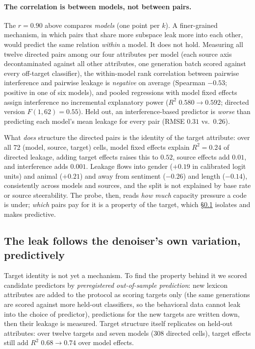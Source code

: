 \documentclass[11pt]{article}
\begin{document}
\paragraph{The correlation is between models, not between pairs.} The $r{=}0.90$
above compares \emph{models} (one point per $k$). A finer-grained mechanism, in which
pairs that share more subspace leak more into each other, would predict the same relation
\emph{within} a model. It does not hold. Measuring all twelve directed pairs among
our four attributes per model (each source axis decontaminated against all other
attributes, one generation batch scored against every off-target classifier), the
within-model rank correlation between pairwise interference and pairwise leakage is
\emph{negative} on average (Spearman $-0.53$; positive in one of six models), and
pooled regressions with model fixed effects assign interference no incremental
explanatory power ($R^2$ $0.580\!\to\!0.592$; directed version $F(1,62){=}0.55$).
Held out, an interference-based predictor is \emph{worse} than predicting each
model's mean leakage for every pair (RMSE $0.31$ vs.\ $0.26$).

What \emph{does} structure the directed pairs is the identity of the target
attribute: over all 72 (model, source, target) cells, model fixed effects explain
$R^2{=}0.24$ of directed leakage, adding target effects raises this to $0.52$,
source effects add $0.01$, and interference adds $0.001$. Leakage flows into gender
($+0.19$ in calibrated logit units) and animal ($+0.21$) and away from sentiment
($-0.26$) and length ($-0.14$), consistently across models and sources, and the
split is not explained by base rate or source steerability. The probe, then, reads
\emph{how much} capacity pressure a code is under; \emph{which} pairs pay for it is
a property of the target, which \S\ref{sec:law} isolates and makes predictive.

\subsection{The leak follows the denoiser's own variation, predictively}
\label{sec:law}
Target identity is not yet a mechanism. To find the property behind it we scored
candidate predictors by \emph{preregistered out-of-sample prediction}: new
lexicon attributes are added to the protocol as scoring targets only (the same
generations are scored against more held-out classifiers, so the behavioral data
cannot leak into the choice of predictor), predictions for the new targets are
written down, then their leakage is measured. Target structure itself replicates
on held-out attributes: over twelve targets and seven models (308 directed
cells), target effects still add $R^2$ $0.68\!\to\!0.74$ over model effects.
\end{document}
